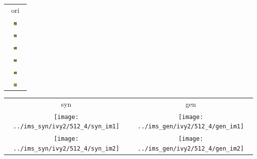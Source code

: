 \documentclass[letter]{article}
\begin{document}
\newpage

\begin{table}[h!]
	\centering
	\begin{tabular}{c}
		ori\tabularnewline
		\includegraphics[width=0.17\textwidth]{../data/ivy2/512/1} \tabularnewline		\includegraphics[width=0.17\textwidth]{../data/ivy2/512/2} \tabularnewline		\includegraphics[width=0.17\textwidth]{../data/ivy2/512/3} \tabularnewline		\includegraphics[width=0.17\textwidth]{../data/ivy2/512/4} \tabularnewline		\includegraphics[width=0.17\textwidth]{../data/ivy2/512/5} \tabularnewline		\includegraphics[width=0.17\textwidth]{../data/ivy2/512/6} \tabularnewline
	\end{tabular}
	\begin{tabular}{cc}
		syn & gen\tabularnewline
		\texttt{[image: ../ims\_syn/ivy2/512\_4/syn\_im1]} & \texttt{[image: ../ims\_gen/ivy2/512\_4/gen\_im1]} \tabularnewline
		\texttt{[image: ../ims\_syn/ivy2/512\_4/syn\_im2]} & \texttt{[image: ../ims\_gen/ivy2/512\_4/gen\_im2]} \tabularnewline

\end{tabular}
\end{table}
\end{document}

